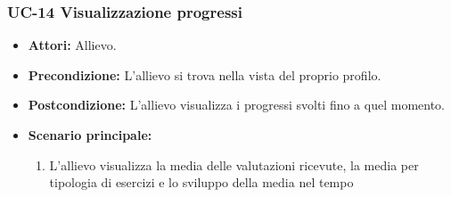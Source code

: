 	\subsubsection{UC-14 Visualizzazione progressi}
	\begin{itemize}
			\item \textbf{Attori:} Allievo.
			\item \textbf{Precondizione:} L'allievo si trova nella vista del proprio profilo.
			\item \textbf{Postcondizione:} L'allievo visualizza i progressi svolti fino a quel momento.
			\item \textbf{Scenario principale:}
				\begin{enumerate}
					\item L'allievo visualizza la media delle valutazioni ricevute, la media per tipologia di esercizi e lo sviluppo della media nel tempo
				\end{enumerate}
	\end{itemize}